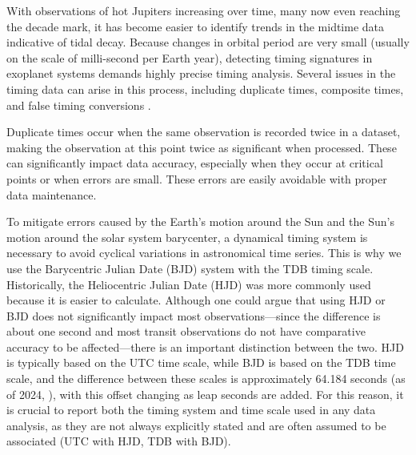 \documentclass[oneside,12pt]{amsart}
\numberwithin{page}{section}
\begin{document}

With observations of hot Jupiters increasing over time, many now even reaching the decade mark, it has become easier to identify trends in the midtime data indicative of tidal decay. Because changes in orbital period are very small (usually on the scale of milli-second per Earth year), detecting timing signatures in exoplanet systems demands highly precise timing analysis. Several issues in the timing data can arise in this process, including duplicate times, composite times, and false timing conversions \citep{adams2024doomed}. 

Duplicate times occur when the same observation is recorded twice in a dataset, making the observation at this point twice as significant when processed. These can significantly impact data accuracy, especially when they occur at critical points or when errors are small. These errors are easily avoidable with proper data maintenance. 

To mitigate errors caused by the Earth's motion around the Sun and the Sun's motion around the solar system barycenter, a dynamical timing system is necessary to avoid cyclical variations in astronomical time series. This is why we use the Barycentric Julian Date (BJD) system with the TDB timing scale. Historically, the Heliocentric Julian Date (HJD) was more commonly used because it is easier to calculate. Although one could argue that using HJD or BJD does not significantly impact most observations—since the difference is about one second \citep{eastman2010achieving} and most transit observations do not have comparative accuracy to be affected—there is an important distinction between the two. HJD is typically based on the UTC time scale, while BJD is based on the TDB time scale, and the difference between these scales is approximately 64.184 seconds (as of 2024, \citep{adams2024doomed}), with this offset changing as leap seconds are added. For this reason, it is crucial to report both the timing system and time scale used in any data analysis, as they are not always explicitly stated and are often assumed to be associated (UTC with HJD, TDB with BJD).
\end{document}
